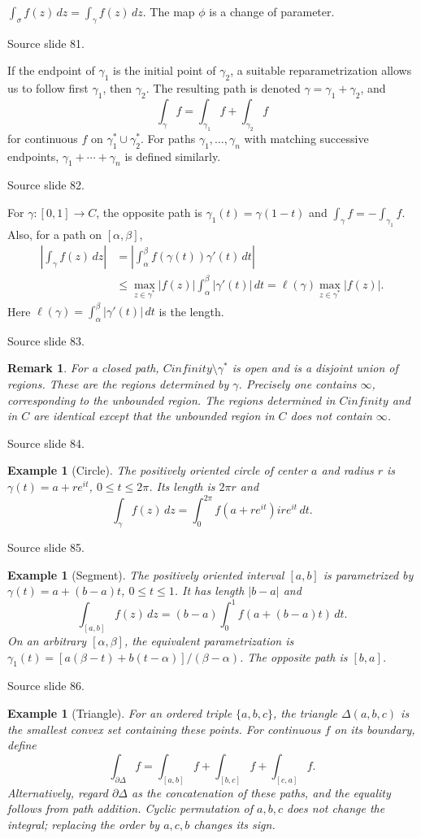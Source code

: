 \documentclass[10pt,letterpaper,twoside,openright]{amsbook}
\numberwithin{equation}{subsection}
\theoremstyle{sea-plain}
\theoremstyle{sea-definition}
\newtheorem{example}[subsection]{Example}
\newtheorem{remark}[subsection]{Remark}
\theoremstyle{sea-exercise}
\newcommand{\RR}{\mathbb{R}}
\newcommand{\CC}{\mathbb{C}}
\newcommand{\DD}{\mathbb{D}}
\newcommand{\HH}{\mathbb{H}}
\newcommand{\Chat}{\mathbb{C}_{\infty}}
\newcommand{\dd}{\,d}
\def\CC{C}\def\RR{R}\def\DD{D}\def\HH{H}\def\Chat{C infinity}}
\newcommand{\src}[1]{\par\smallskip\noindent
 {\scriptsize\sffamily\color{SoftWhite}Source slide #1.}\par\nopagebreak\smallskip}
\begin{document}
$\int_\sigma f(z)\dd z=\int_\gamma f(z)\dd z$.
The map $\phi$ is a change of parameter.
\src{81}
If the endpoint of $\gamma_1$ is the initial point of $\gamma_2$, a suitable
reparametrization allows us to follow first $\gamma_1$, then $\gamma_2$.
The resulting path is denoted $\gamma=\gamma_1+\gamma_2$, and
\[
 \int_\gamma f=\int_{\gamma_1}f+\int_{\gamma_2}f
\]
for continuous $f$ on $\gamma_1^*\cup\gamma_2^*$.
For paths $\gamma_1,\ldots,\gamma_n$ with matching successive endpoints,
$\gamma_1+\cdots+\gamma_n$ is defined similarly.
\src{82}
For $\gamma:[0,1]\to\CC$, the opposite path is
$\gamma_1(t)=\gamma(1-t)$ and $\int_\gamma f=-\int_{\gamma_1}f$.
Also, for a path on $[\alpha,\beta]$,
\[
\begin{aligned}
 \left|\int_\gamma f(z)\dd z\right|
 &=\left|\int_\alpha^\beta f(\gamma(t))\gamma'(t)\dd t\right|\\
 &\leq\max_{z\in\gamma^*}|f(z)|\int_\alpha^\beta|\gamma'(t)|\dd t
 =\ell(\gamma)\max_{z\in\gamma^*}|f(z)|.
\end{aligned}
\]
Here $\ell(\gamma)=\int_\alpha^\beta|\gamma'(t)|\dd t$ is the length.
\src{83}
\begin{remark}
For a closed path, $\Chat\setminus\gamma^*$ is open and is a disjoint
union of regions. These are the regions determined by $\gamma$.
Precisely one contains $\infty$, corresponding to the unbounded region.
The regions determined in $\Chat$ and in $\CC$ are identical except that
the unbounded region in $\CC$ does not contain $\infty$.
\end{remark}
\src{84}
\begin{example}[Circle]
The positively oriented circle of center $a$ and radius $r$ is
$\gamma(t)=a+re^{it}$, $0\leq t\leq2\pi$. Its length is $2\pi r$ and
\[
 \int_\gamma f(z)\dd z=\int_0^{2\pi}f(a+re^{it})ire^{it}\dd t.
\]
\end{example}
\src{85}
\begin{example}[Segment]
The positively oriented interval $[a,b]$ is parametrized by
$\gamma(t)=a+(b-a)t$, $0\leq t\leq1$. It has length $|b-a|$ and
\[
 \int_{[a,b]}f(z)\dd z=(b-a)\int_0^1f(a+(b-a)t)\dd t.
\]
On an arbitrary $[\alpha,\beta]$, the equivalent parametrization is
$\gamma_1(t)=[a(\beta-t)+b(t-\alpha)]/(\beta-\alpha)$.
The opposite path is $[b,a]$.
\end{example}
\src{86}
\begin{example}[Triangle]
For an ordered triple $\{a,b,c\}$, the triangle $\Delta(a,b,c)$ is the
smallest convex set containing these points. For continuous $f$ on its
boundary, define
\[
 \int_{\partial\Delta}f=\int_{[a,b]}f+\int_{[b,c]}f+\int_{[c,a]}f.
\]
Alternatively, regard $\partial\Delta$ as the concatenation of these paths,
and the equality follows from path addition. Cyclic permutation of
$a,b,c$ does not change the integral; replacing the order by $a,c,b$
changes its sign.
\end{example}
\end{document}
